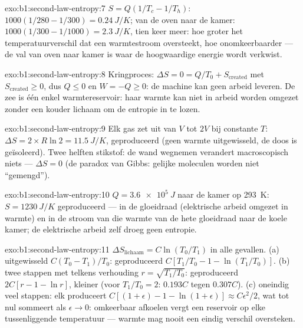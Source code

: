 \begin{solution}{exo:b1:second-law-entropy:7}
$S = Q(1/T_c - 1/T_h)$: $1000(1/280 - 1/300) = \qty{0.24}{J/K}$; van de oven naar de
kamer: $1000(1/300 - 1/1000) = \qty{2.3}{J/K}$, tien keer meer: hoe groter
het temperatuurverschil dat een warmtestroom oversteekt, hoe onomkeerbaarder --- de
val van oven naar kamer is waar de hoogwaardige energie wordt verkwist.
\end{solution}

\begin{solution}{exo:b1:second-law-entropy:8}
Kringproces: $\Delta S = 0 = Q/T_0 + S_{\mathrm{created}}$ met $S_{\mathrm{created}} \geq 0$,
dus $Q \leq 0$ en $W = -Q \geq 0$: de machine kan geen arbeid leveren. De
zee is één enkel warmtereservoir: haar warmte kan niet in arbeid worden omgezet zonder
een kouder lichaam om de entropie in te lozen.
\end{solution}

\begin{solution}{exo:b1:second-law-entropy:9}
Elk gas zet uit van $V$ tot $2V$ bij constante $T$: $\Delta S = 2 \times R\ln2
= \qty{11.5}{J/K}$, geproduceerd (geen warmte uitgewisseld, de doos is geïsoleerd). Twee
helften stikstof: de wand wegnemen verandert macroscopisch niets ---
$\Delta S = 0$ (de paradox van Gibbs: gelijke moleculen worden niet ``gemengd'').
\end{solution}

\begin{solution}{exo:b1:second-law-entropy:10}
$Q = \qty{3.6e5}{J}$ naar de kamer op \qty{293}{K}: $S = \qty{1230}{J/K}$
geproduceerd --- in de gloeidraad (elektrische arbeid omgezet in warmte) en in de
stroom van die warmte van de hete gloeidraad naar de koele kamer; de elektrische
arbeid zelf droeg geen entropie.
\end{solution}

\begin{solution}{exo:b1:second-law-entropy:11}
$\Delta S_{\text{lichaam}} = C\ln(T_0/T_1)$ in alle gevallen. (a) uitgewisseld
$C(T_0 - T_1)/T_0$: geproduceerd $C[T_1/T_0 - 1 - \ln(T_1/T_0)]$. (b) twee stappen
met telkens verhouding $r = \sqrt{T_1/T_0}$: geproduceerd $2C[r - 1 - \ln r]$, kleiner
(voor $T_1/T_0 = 2$: $0.193C$ tegen $0.307C$). (c) oneindig veel stappen:
elk produceert $C[(1 + \epsilon) - 1 - \ln(1 + \epsilon)] \approx C\epsilon^2/2$,
wat tot nul sommeert als $\epsilon \to 0$: omkeerbaar afkoelen vergt een reservoir
op elke tussenliggende temperatuur --- warmte mag nooit een eindig verschil oversteken.
\end{solution}


